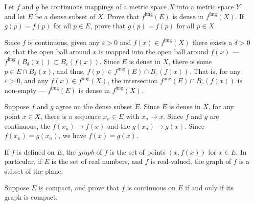 \documentclass[12 pt, letterpaper]{hmcpset}
\begin{document}
\begin{problem}
	Let $f$ and $g$ be continuous mappings of a metric space $X$ into a metric space $Y$ and let $E$ be a dense subset of $X$. Prove that $f^{\text{img}}(E)$ is dense in $f^{\text{img}}(X)$. If $g(p) = f(p)$ for all $p \in E$, prove that $g(p) = f(p)$ for all $p \in X$.
\end{problem}

\begin{solution}
	Since $f$ is continuous, given any $\varepsilon > 0$ and $f(x) \in f^{\text{img}}(X)$ there exists a $\delta > 0$ so that the open ball around $x$ is mapped into the open ball around $f(x)$ --- $f^{\text{img}}(B_{\delta}(x)) \subset B_{\varepsilon}(f(x))$. Since $E$ is dense in $X$, there is some $p \in E \cap B_{\delta}(x)$, and thus, $f(p) \in f^{\text{img}}(E) \cap B_{\varepsilon}(f(x))$. That is, for any $\varepsilon > 0$, and any $f(x) \in f^{\text{img}}(X)$, the intersection $f^{\text{img}}(E) \cap B_{\varepsilon}(f(x))$ is non-empty --- $f^{\text{img}}(E)$ is dense in $f^{\text{img}}(X)$.

Suppose $f$ and $g$ agree on the dense subset $E$. Since $E$ is dense in $X$, for any point $x \in X$, there is a sequence $x_{n} \in E$ with $x_{n} \to x$. Since $f$ and $g$ are continuous, the $f(x_{n}) \to f(x)$ and the $g(x_{n}) \to g(x)$. Since $f(x_{n}) = g(x_{n})$, we have $f(x) = g(x)$.
\end{solution}

\pagebreak

\begin{problem}
	If $f$ is defined on $E$, the \emph{graph} of $f$ is the set of points $(x, f(x))$ for $x \in E$. In particular, if $E$ is the set of real numbers, and $f$ is real-valued, the graph of $f$ is a subset of the plane.

	Suppose $E$ is compact, and prove that $f$ is continuous on $E$ if and only if its graph is compact.
\end{problem}
\end{document}
